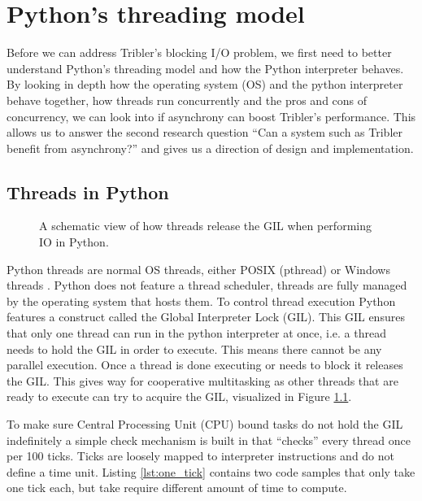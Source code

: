 \chapter{Python's threading model}
\label{cpt:pythons_thread_model}

Before we can address Tribler's blocking I/O problem, we first need to better understand Python's threading model and how the Python interpreter behaves.
By looking in depth how the operating system (OS) and the python interpreter behave together, how threads run concurrently and the pros and cons of concurrency, we can look into if asynchrony can boost Tribler's performance.
This allows us to answer the second research question \enquote{Can a system such as Tribler benefit from asynchrony?} and gives us a direction of design and implementation.

\section{Threads in Python}

\begin{figure}[!h]
	\caption{A schematic view of how threads release the GIL when performing IO in Python.}
	\label{fig:python_threads_release_gil}
\end{figure}

Python threads are normal OS threads, either POSIX (pthread) or Windows threads \cite{beazley2010understanding, beazley2009inside}.
Python does not feature a thread scheduler, threads are fully managed by the operating system that hosts them.
To control thread execution Python features a construct called the Global Interpreter Lock (GIL).
This GIL ensures that only one thread can run in the python interpreter at once, i.e. a thread needs to hold the GIL in order to execute.
This means there cannot be any parallel execution.
Once a thread is done executing or needs to block it releases the GIL.
This gives way for cooperative multitasking as other threads that are ready to execute can try to acquire the GIL, visualized in Figure \ref{fig:python_threads_release_gil}.

To make sure Central Processing Unit (CPU) bound tasks do not hold the GIL indefinitely a simple check mechanism is built in that \enquote{checks} every thread once per 100 ticks.
Ticks are loosely mapped to interpreter instructions and do not define a time unit.
Listing \ref{lst:one_tick} contains two code samples that only take one tick each, but take require different amount of time to compute.

